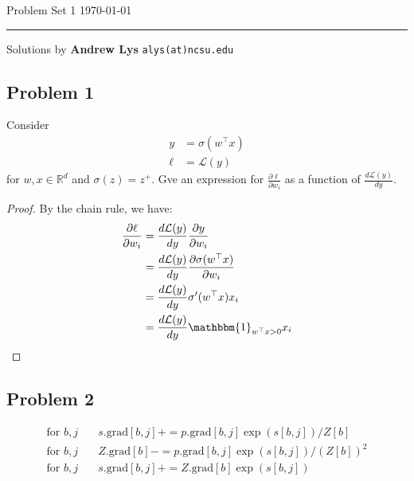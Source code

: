 \documentclass{amsart}
\newcommand{\rr}{\mathbb R}    %
\newcommand{\cL}{\mathcal{L}}
\theoremstyle{definition}
\begin{document}
\noindent
Problem Set 1  \hfill \today  %
\smallskip
\hrule
\smallskip
\noindent
Solutions by {\bf Andrew Lys} \qquad   %
  {\tt alys(at)ncsu.edu}

\vspace{0.5cm}
\subsection*{Problem 1}
Consider 
\begin{align*}
    y &= \sigma(w^\top x)\\
    \ell &= \cL(y)
\end{align*}
for $w, x \in \rr^d$ and $\sigma(z)=z^+$. Gve an expression for $\frac{\partial \ell}{\partial w_i}$ as a function of $\frac{d \cL(y)}{dy}$.
\begin{proof}
    By the chain rule, we have:
    \begin{align*}
        \frac{\partial \ell}{\partial w_i} &= \frac{d \cL(y)}{d y}  \frac{\partial y}{\partial w_i} \\
        &= \frac{d \cL(y)}{d y}  \frac{\partial \sigma(w^\top x)}{\partial w_i} \\
        &= \frac{d \cL(y)}{d y}  \sigma'(w^\top x)  x_i\\
        &= \frac{d \cL(y)}{d y}  \mathbbm{1}_{w^\top x > 0}  x_i
    \end{align*}
\end{proof}

\subsection*{Problem 2}
\begin{align*}
    \text{for } b, j &\quad s.\text{grad}[b,j] += p.\text{grad}[b,j]  \exp(s[b,j])/Z[b]\\
    \text{for } b, j &\quad Z.\text{grad}[b] -= p.\text{grad}[b,j]  \exp(s[b,j])/(Z[b])^2\\
    \text{for } b, j & \quad s.\text{grad}[b,j] += Z.\text{grad}[b]  \exp(s[b,j])
\end{align*}
\end{document}
